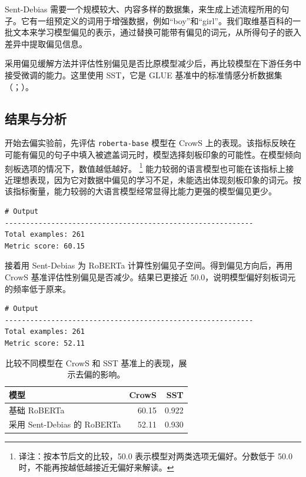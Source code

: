 Sent-Debias 需要一个规模较大、内容多样的数据集，来生成上述流程所用的句子。它有一组预定义的词用于增强数据，例如“boy”和“girl”。我们取维基百科的一批文本来学习模型偏见的表示，通过替换可能带有偏见的词元，从所得句子的嵌入差异中提取偏见信息。

采用偏见缓解方法并评估性别偏见是否比原模型减少后，再比较模型在下游任务中接受微调的能力。这里使用 SST，它是 GLUE 基准中的标准情感分析数据集（；）。

\subsection{结果与分析}
开始去偏实验前，先评估 \texttt{roberta-base} 模型在 CrowS 上的表现。该指标反映在可能有偏见的句子中填入被遮盖词元时，模型选择刻板印象的可能性。在模型倾向刻板选项的情况下，数值越低越好。%
\footnote{译注：按本节后文的比较，50.0 表示模型对两类选项无偏好。分数低于 50.0 时，不能再按越低越接近无偏好来解读。}
能力较弱的语言模型也可能在该指标上接近理想表现，因为它对数据中偏见的学习不足，未能选出体现刻板印象的词元。按该指标衡量，能力较弱的大语言模型经常显得比能力更强的模型偏见更少。

\noindent\begin{minipage}{\linewidth}
\begin{lstlisting}[caption={RoBERTa 的 CrowS 指标},label={lst:ch06-crows-original}]
# Output
-----------------------------------------------------------
Total examples: 261
Metric score: 60.15
\end{lstlisting}
\end{minipage}\par

接着用 Sent-Debias 为 RoBERTa 计算性别偏见子空间。得到偏见方向后，再用 CrowS 基准评估性别偏见是否减少。结果已更接近 50.0，说明模型偏好刻板词元的频率低于原来。

\noindent\begin{minipage}{\linewidth}
\begin{lstlisting}[caption={去偏后重新评估 CrowS 指标},label={lst:ch06-crows-debiased}]
# Output
-----------------------------------------------------------
Total examples: 261
Metric score: 52.11
\end{lstlisting}
\end{minipage}\par

\begin{table}[!htbp]
\centering
\caption{比较不同模型在 CrowS 和 SST 基准上的表现，展示去偏的影响。}
\label{tab:ch06-crows-sst}
\begin{tabular}{@{}lrr@{}}
\toprule
模型 & CrowS & SST\\
\midrule
基础 RoBERTa & 60.15 & 0.922\\
采用 Sent-Debias 的 RoBERTa & 52.11 & 0.930\\
\bottomrule
\end{tabular}
\end{table}

